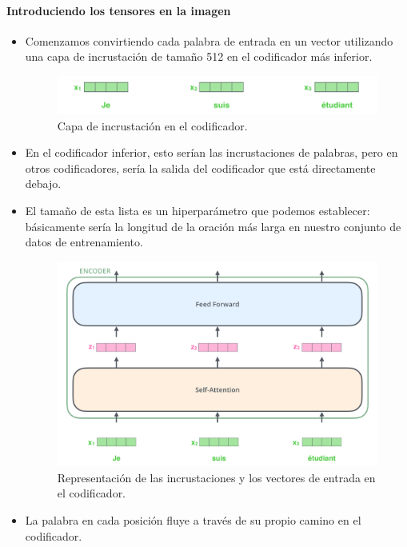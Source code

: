 \paragraph{Introduciendo los tensores en la imagen}
\begin{itemize}
\item Comenzamos convirtiendo cada palabra de entrada en un vector utilizando una capa de incrustación de tamaño 512 en el codificador más inferior.
\begin{figure}[h]
\centering
\includegraphics[scale=0.35]{pics/embeddings_enc.png}
\caption{Capa de incrustación en el codificador.}
\end{figure}

\item En el codificador inferior, esto serían las incrustaciones de palabras, pero en otros codificadores, sería la salida del codificador que está directamente debajo.

\item El tamaño de esta lista es un hiperparámetro que podemos establecer: básicamente sería la longitud de la oración más larga en nuestro conjunto de datos de entrenamiento.

\begin{figure}[h]
\centering
\includegraphics[scale=0.2]{pics/encoder_with_tensors.png}
\caption{Representación de las incrustaciones y los vectores de entrada en el codificador.}
\end{figure}

\item La palabra en cada posición fluye a través de su propio camino en el codificador.


\end{itemize}
